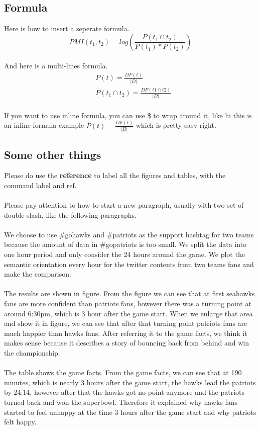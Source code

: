 \documentclass{article}
\begin{document}
\subsection{Formula}
Here is how to insert a seperate formula.\\
\begin{equation*}
PMI(t_1, t_2) = log\left( \frac{P(t_1\cap t_2)}{P(t_1)*P(t_2)}\right) 
\end{equation*} 
\\
And here is a multi-lines formula.\\
\begin{equation*}
\begin{split}
&P(t) =\frac{DF(t)}{|D|}\\
&P(t_1\cap t_2) = \frac{DF(t1\cap t2)}{|D|}
\end{split}
\end{equation*}
\\
If you want to use inline formula, you can use \$ to wrap around it, like hi this is an inline formula example $P(t) =\frac{DF(t)}{|D|}$ which is pretty easy right.
\subsection{Some other things}
Please do use the \large{\textbf{reference}} to label all the figures and tables, with the command label and ref.\\
\\
Please pay attention to how to start a new paragraph, usually with two set of double-slash, like the following paragraphs.\\
\\
We choose to use \#gohawks and \#patriots as the support hashtag for two teams because the amount of data in \#gopatriots is too small. We split the data into one hour period and only consider the 24 hours around the game. We plot the semantic orientation every hour for the twitter contents from two teams fans and make the comparison. \\
\\
The results are shown in figure. From the figure we can see that at first seahawks fans are more confident than patriots fans, however there was a turning point at around  6:30pm, which is 3 hour after the game start. When we enlarge that area and show it in figure, we can see that after that turning point patriots fans are much happier than hawks fans. After referring it to the game facts, we think it makes sense because it describes a story of bouncing back from behind and win the championship. \\
\\
The table shows the game facts. From the game facts, we can see that at 190 minutes, which is nearly 3 hours after the game start, the hawks lead the patriots by 24:14, however after that the hawks got no point anymore and the patriots turned back and won the superbowl. Therefore it explained why hawks fans started to feel unhappy at the time 3 hours after the game start and why patriots felt happy.
\end{document}
